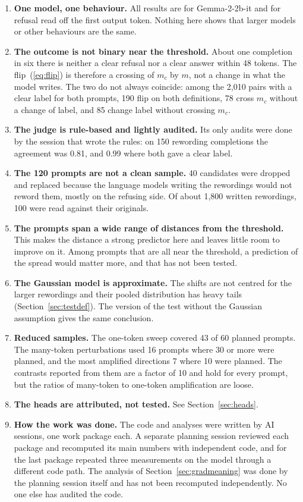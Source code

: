 \documentclass[11pt]{article}
\newcommand{\mc}{m_c}
\begin{document}
\begin{enumerate}
\item \textbf{One model, one behaviour.} All results are for Gemma-2-2b-it and for refusal read off the first output token. Nothing here shows that larger models or other behaviours are the same.
\item \textbf{The outcome is not binary near the threshold.} About one completion in six there is neither a clear refusal nor a clear answer within 48 tokens. The flip~(\ref{eq:flip}) is therefore a crossing of $\mc$ by $m$, not a change in what the model writes. The two do not always coincide: among the 2{,}010 pairs with a clear label for both prompts, 190 flip on both definitions, 78 cross $\mc$ without a change of label, and 85 change label without crossing $\mc$.
\item \textbf{The judge is rule-based and lightly audited.} Its only audits were done by the session that wrote the rules: on 150 rewording completions the agreement was 0.81, and 0.99 where both gave a clear label.
\item \textbf{The 120 prompts are not a clean sample.} 40 candidates were dropped and replaced because the language models writing the rewordings would not reword them, mostly on the refusing side. Of about 1{,}800 written rewordings, 100 were read against their originals.
\item \textbf{The prompts span a wide range of distances from the threshold.} This makes the distance a strong predictor here and leaves little room to improve on it. Among prompts that are all near the threshold, a prediction of the spread would matter more, and that has not been tested.
\item \textbf{The Gaussian model is approximate.} The shifts are not centred for the larger rewordings and their pooled distribution has heavy tails (Section~\ref{sec:testdef}). The version of the test without the Gaussian assumption gives the same conclusion.
\item \textbf{Reduced samples.} The one-token sweep covered 43 of 60 planned prompts. The many-token perturbations used 16 prompts where 30 or more were planned, and the most amplified directions 7 where 10 were planned. The contrasts reported from them are a factor of 10 and hold for every prompt, but the ratios of many-token to one-token amplification are loose.
\item \textbf{The heads are attributed, not tested.} See Section~\ref{sec:heads}.
\item \textbf{How the work was done.} The code and analyses were written by AI sessions, one work package each. A separate planning session reviewed each package and recomputed its main numbers with independent code, and for the last package repeated three measurements on the model through a different code path. The analysis of Section~\ref{sec:gradmeaning} was done by the planning session itself and has not been recomputed independently. No one else has audited the code.

\end{enumerate}
\end{document}
